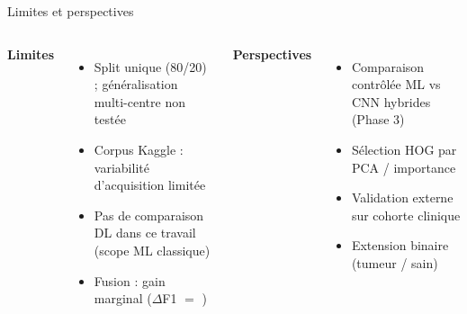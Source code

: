 \begin{frame}{Limites et perspectives}
  \begin{columns}[T]
    \textbf{Limites}
    \begin{itemize}
      \item Split unique (80/20) ; généralisation multi-centre non testée
      \item Corpus Kaggle : variabilité d'acquisition limitée
      \item Pas de comparaison DL dans ce travail (scope ML classique)
      \item Fusion : gain marginal ($\Delta$F1 $=$ \FusionDeltaFOne)
    \end{itemize}
    \textbf{Perspectives}
    \begin{itemize}
      \item Comparaison contrôlée ML vs CNN hybrides (Phase 3)
      \item Sélection HOG par PCA / importance
      \item Validation externe sur cohorte clinique
      \item Extension binaire (tumeur / sain)
    \end{itemize}
  \end{columns}
\end{frame}

